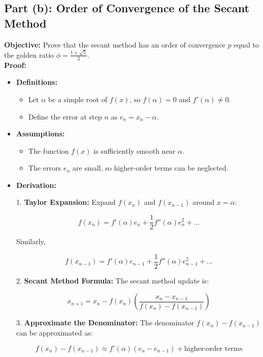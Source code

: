 \documentclass[12pt]{article}
\begin{document}
\subsection*{Part (b): Order of Convergence of the Secant Method}

\textbf{Objective:} Prove that the secant method has an order of convergence \( p \) equal to the golden ratio \( \phi = \frac{1 + \sqrt{5}}{2} \).
\\
\textbf{Proof:}

\begin{itemize}
    \item \textbf{Definitions:}
    \begin{itemize}
        \item Let \( \alpha \) be a simple root of \( f(x) \), so \( f(\alpha) = 0 \) and \( f'(\alpha) \neq 0 \).
        \item Define the error at step \( n \) as \( e_n = x_n - \alpha \).
    \end{itemize}

    \item \textbf{Assumptions:}
    \begin{itemize}
        \item The function \( f(x) \) is sufficiently smooth near \( \alpha \).
        \item The errors \( e_n \) are small, so higher-order terms can be neglected.
    \end{itemize}

    \item \textbf{Derivation:}
    
    1. \textbf{Taylor Expansion:} Expand \( f(x_n) \) and \( f(x_{n-1}) \) around \( x = \alpha \):
    
    \[
    f(x_n) = f'(\alpha)e_n + \frac{1}{2}f''(\alpha)e_n^2 + \ldots
    \]
    
    Similarly,
    
    \[
    f(x_{n-1}) = f'(\alpha)e_{n-1} + \frac{1}{2}f''(\alpha)e_{n-1}^2 + \ldots
    \]
    
    2. \textbf{Secant Method Formula:} The secant method update is:
    
    \[
    x_{n+1} = x_n - f(x_n) \left( \frac{x_n - x_{n-1}}{f(x_n) - f(x_{n-1})} \right)
    \]
    
    3. \textbf{Approximate the Denominator:} The denominator \( f(x_n) - f(x_{n-1}) \) can be approximated as:
    
    \[
    f(x_n) - f(x_{n-1}) \approx f'(\alpha)(e_n - e_{n-1}) + \text{higher-order terms}
    \]
    

\end{itemize}
\end{document}

